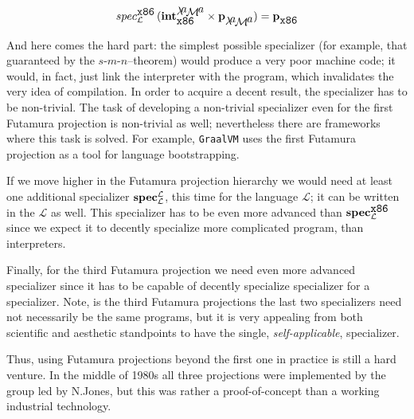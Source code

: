 \[
\SpecS{\mbox{\texttt{x86}}}{\mathcal{L}}\,(\Int{\mbox{\lama}}{\mbox{\texttt{x86}}}\times \primi{p}^\ph_{\mbox{\lama}})=\primi{p}^\ph_{\mbox{\texttt{x86}}}
\]


And here comes the hard part: the simplest possible specializer (for example, that guaranteed by the $s$-$m$-$n$--theorem) would produce a very
poor machine code; it would, in fact, just link the interpreter with the program, which invalidates the very idea of compilation. In order to
acquire a decent result, the specializer has to be non-trivial. The task of developing a non-trivial specializer even for the first Futamura
projection is non-trivial as well; nevertheless there are frameworks where this task is solved. For example, \texttt{GraalVM} uses the first Futamura projection
as a tool for language bootstrapping.

If we move higher in the Futamura projection hierarchy we would need at least one additional specializer $\mathbf{spec}^{\mathcal{L}}_{\mathcal {L}}$, this time
for the language $\mathcal{L}$; it can be written in the $\mathcal{L}$ as well. This specializer has to be even more advanced than
$\mathbf{spec}^{\mathcal{\mbox{\texttt{x86}}}}_{\mathcal {\mathcal{L}}}$ since we expect it to decently specialize more complicated program, than interpreters.

Finally, for the third Futamura projection we need even more advanced specializer since it has to be capable of decently specialize specializer for a
specializer. Note, is the third Futamura projections the last two specializers need not necessarily be the same programs, but it is very
appealing from both scientific and aesthetic standpoints to have the single, \emph{self-applicable}, specializer.

Thus, using Futamura projections beyond the first one in practice is still a hard venture. In the middle of 1980s all three projections were
implemented by the group led by N.Jones, but this was rather a proof-of-concept than a working industrial technology.
